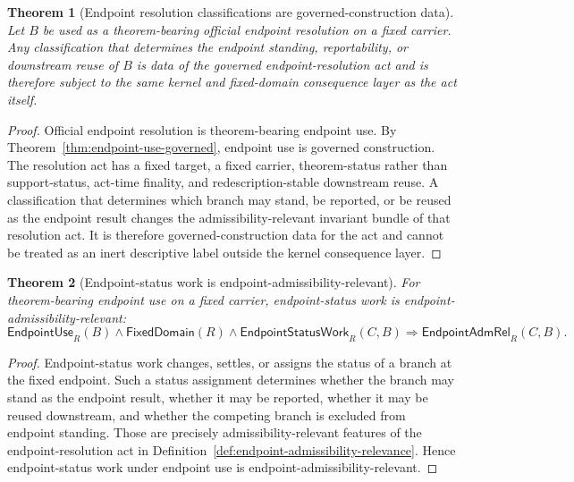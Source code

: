 \documentclass[11pt]{article}
\newtheorem{theorem}{Theorem}[section]
\theoremstyle{definition}
\theoremstyle{remark}
\newcommand{\EndpointUse}{\mathsf{EndpointUse}}
\newcommand{\FixedDom}{\mathsf{FixedDomain}}
\newcommand{\EndpointStatusWork}{\mathsf{EndpointStatusWork}}
\newcommand{\EndpointAdmRel}{\mathsf{EndpointAdmRel}}
\begin{document}
\begin{theorem}[Endpoint resolution classifications are governed-construction data]\label{thm:endpoint-resolution-classifications-governed}
Let \(B\) be used as a theorem-bearing official endpoint resolution on a fixed carrier. Any classification that determines the endpoint standing, reportability, or downstream reuse of \(B\) is data of the governed endpoint-resolution act and is therefore subject to the same kernel and fixed-domain consequence layer as the act itself.
\end{theorem}

\begin{proof}
Official endpoint resolution is theorem-bearing endpoint use. By Theorem~\ref{thm:endpoint-use-governed}, endpoint use is governed construction. The resolution act has a fixed target, a fixed carrier, theorem-status rather than support-status, act-time finality, and redescription-stable downstream reuse. A classification that determines which branch may stand, be reported, or be reused as the endpoint result changes the admissibility-relevant invariant bundle of that resolution act. It is therefore governed-construction data for the act and cannot be treated as an inert descriptive label outside the kernel consequence layer.
\end{proof}

\begin{theorem}[Endpoint-status work is endpoint-admissibility-relevant]\label{thm:endpoint-status-work-adm-relevant}
For theorem-bearing endpoint use on a fixed carrier, endpoint-status work is endpoint-admissibility-relevant:
\[
  \EndpointUse_R(B)\wedge\FixedDom(R)\wedge\EndpointStatusWork_R(C,B)
  \Rightarrow \EndpointAdmRel_R(C,B).
\]
\end{theorem}

\begin{proof}
Endpoint-status work changes, settles, or assigns the status of a branch at the fixed endpoint. Such a status assignment determines whether the branch may stand as the endpoint result, whether it may be reported, whether it may be reused downstream, and whether the competing branch is excluded from endpoint standing. Those are precisely admissibility-relevant features of the endpoint-resolution act in Definition~\ref{def:endpoint-admissibility-relevance}. Hence endpoint-status work under endpoint use is endpoint-admissibility-relevant.
\end{proof}
\end{document}

